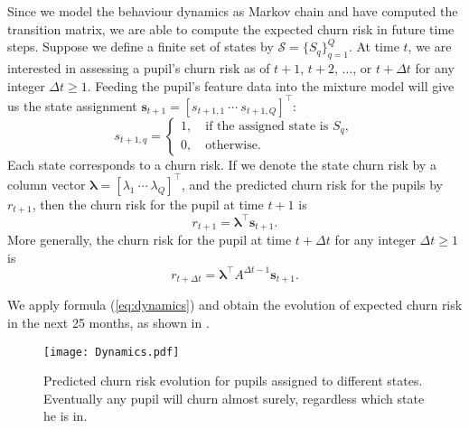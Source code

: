 Since we model the behaviour dynamics as Markov chain and have computed the transition matrix, we are able to compute the expected churn risk in future time steps. Suppose we define a finite set of states by $\mathcal{S} = \{S_q\}_{q=1}^Q$. At time $t$, we are interested in assessing a pupil's churn risk as of $t+1$, $t+2$, ..., or $t+\Delta t$ for any integer $\Delta t \geq 1$. Feeding the pupil's feature data into the mixture model will give us the state assignment $\mathbf{s}_{t+1} = [s_{t+1,1} ~\cdots ~s_{t+1,Q}]^\top $:
\begin{equation}
s_{t+1,q} = 
	\begin{cases}
	1, \quad \text{if the assigned state is } S_q, \\
	0, \quad \text{otherwise}. 
	\end{cases}
\end{equation}
Each state corresponds to a churn risk. If we denote the state churn risk by a column vector $\bm\lambda = [\lambda_1 ~\cdots ~\lambda_Q]^\top$, and the predicted churn risk for the pupils by $r_{t+1}$, then the churn risk for the pupil at time $t+1$ is
\begin{equation}
r_{t+1} = \bm\lambda^\top \mathbf{s}_{t+1}.
\end{equation}
More generally, the churn risk for the pupil at time $t+\Delta t$ for any integer $\Delta t \geq 1$ is
\begin{equation}
r_{t+\Delta t} = \bm\lambda^\top A^{\Delta t -1 } \mathbf{s}_{t+1}.
\label{eq:dynamics}
\end{equation}

We apply formula (\ref{eq:dynamics}) and obtain the evolution of expected churn risk in the next 25 months, as shown in .

\begin{figure}[!h]
\vspace*{-0.3cm}
\centering
\texttt{[image: Dynamics.pdf]}
\caption{Predicted churn risk evolution for pupils assigned to different states. Eventually any pupil will churn almost surely, regardless which state he is in.}
\label{fig:dynamics}
\end{figure}

